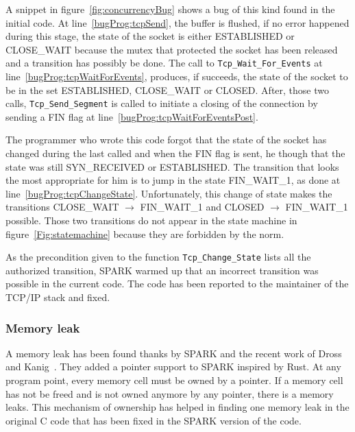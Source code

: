 \documentclass[runningheads]{llncs}
\let\Spark\lstinline
\let\state\textsf
\let\flag\textsf
\begin{document}
    A snippet in figure~\ref{fig:concurrencyBug} shows a bug of this kind found in the initial code.
    At line~\ref{bugProg:tcpSend}, the buffer is flushed, if no error happened during this stage,
    the state of the socket is either \state{ESTABLISHED} or \state{CLOSE\_WAIT} because the mutex
    that protected the socket has been released and a transition has possibly be done. The call to
    \Spark{Tcp_Wait_For_Events} at line~\ref{bugProg:tcpWaitForEvents}, produces, if succeeds, the
    state of the socket to be in the set \state{ESTABLISHED}, \state{CLOSE\_WAIT} or \state{CLOSED}.
    After, those two calls, \Spark{Tcp_Send_Segment} is called to initiate a closing of the connection
    by sending a \flag{FIN} flag at line~\ref{bugProg:tcpWaitForEventsPost}.

    The programmer who wrote this code forgot that the state of the socket has changed during the last
    called and when the \flag{FIN} flag is sent, he though that the state was still \state{SYN\_RECEIVED}
    or \state{ESTABLISHED}. The transition that looks the most appropriate for him is to jump in the state
    \state{FIN\_WAIT\_1}, as done at line~\ref{bugProg:tcpChangeState}. Unfortunately, this change of
    state makes the transitions \state{CLOSE\_WAIT} $\rightarrow$ \state{FIN\_WAIT\_1} and
    \state{CLOSED} $\rightarrow$ \state{FIN\_WAIT\_1} possible. Those two transitions do not
    appear in the state machine in figure~\ref{Fig:statemachine} because they are forbidden by the
    norm.

    As the precondition given to the function \Spark{Tcp_Change_State} lists all the authorized transition,
    SPARK warmed up that an incorrect transition was possible in the current code. The code has been reported to
    the maintainer of the TCP/IP stack and fixed.



\subsubsection{Memory leak}

    A memory leak has been found thanks by SPARK and the recent work of Dross and Kanig~\cite{dross2020recursive}.
    They added a pointer support to SPARK inspired by Rust. At any program point, every memory cell must be owned by a pointer.
    If a memory cell has not be freed and is not owned anymore by any pointer, there is a memory leaks.
    This mechanism of ownership has helped in finding one memory leak in the original C code that has been fixed in the
    SPARK version of the code.
\end{document}
